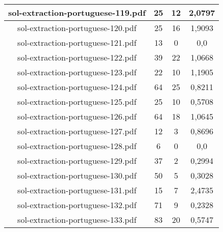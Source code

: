 \documentclass[11pt]{article}
\newlength\mylength
\begin{document}
\begin{center}
\begin{longtable}{||C{.40\mylength}||C{.30\mylength}||C{.30\mylength}||C{.30\mylength}||}
  sol-extraction-portuguese-119.pdf & 25 & 12 & 2,0797 \\  \hline
  sol-extraction-portuguese-120.pdf & 25 & 16 & 1,9093 \\  \hline
  sol-extraction-portuguese-121.pdf & 13 & 0 & 0,0 \\  \hline
  sol-extraction-portuguese-122.pdf & 39 & 22 & 1,0668 \\  \hline
  sol-extraction-portuguese-123.pdf & 22 & 10 & 1,1905 \\  \hline
  sol-extraction-portuguese-124.pdf & 64 & 25 & 0,8211 \\  \hline
  sol-extraction-portuguese-125.pdf & 25 & 10 & 0,5708 \\  \hline
  sol-extraction-portuguese-126.pdf & 64 & 18 & 1,0645 \\  \hline
  sol-extraction-portuguese-127.pdf & 12 & 3 & 0,8696 \\  \hline
  sol-extraction-portuguese-128.pdf & 6 & 0 & 0,0 \\  \hline
  sol-extraction-portuguese-129.pdf & 37 & 2 & 0,2994 \\  \hline
  sol-extraction-portuguese-130.pdf & 50 & 5 & 0,3028 \\  \hline
  sol-extraction-portuguese-131.pdf & 15 & 7 & 2,4735 \\  \hline
  sol-extraction-portuguese-132.pdf & 71 & 9 & 0,2328 \\  \hline
  sol-extraction-portuguese-133.pdf & 83 & 20 & 0,5747 \\  \hline

\end{longtable}
\end{center}
\end{document}
